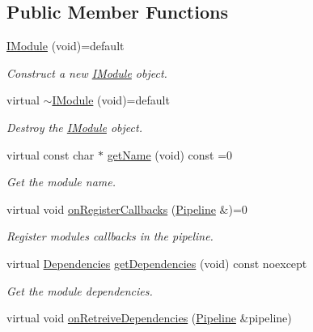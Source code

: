 \subsection*{Public Member Functions}
\begin{DoxyCompactItemize}
\item 
\mbox{\hyperlink{classo_z_1_1_i_module_a21fdd98fb701ae6f7f0e0de14beb72de}{I\+Module}} (void)=default
\begin{DoxyCompactList}\small\item\em Construct a new \mbox{\hyperlink{classo_z_1_1_i_module}{I\+Module}} object. \end{DoxyCompactList}\item 
virtual \mbox{\hyperlink{classo_z_1_1_i_module_a6ac6f3edf9fe885b2510dc01379a951c}{$\sim$\+I\+Module}} (void)=default
\begin{DoxyCompactList}\small\item\em Destroy the \mbox{\hyperlink{classo_z_1_1_i_module}{I\+Module}} object. \end{DoxyCompactList}\item 
virtual const char $\ast$ \mbox{\hyperlink{classo_z_1_1_i_module_af41d45158fd28e1bd86a34e25f5282d6}{get\+Name}} (void) const =0
\begin{DoxyCompactList}\small\item\em Get the module name. \end{DoxyCompactList}\item 
virtual void \mbox{\hyperlink{classo_z_1_1_i_module_a3dc905faa6df5e22eecc6ffbc923fd95}{on\+Register\+Callbacks}} (\mbox{\hyperlink{classo_z_1_1_pipeline}{Pipeline}} \&)=0
\begin{DoxyCompactList}\small\item\em Register module\textquotesingle{}s callbacks in the pipeline. \end{DoxyCompactList}\item 
virtual \mbox{\hyperlink{classo_z_1_1_i_module_ac13210556cb2a65d186bfbe5208c666c}{Dependencies}} \mbox{\hyperlink{classo_z_1_1_i_module_a720a329e6ebcbecbc150d8b0bbee6e37}{get\+Dependencies}} (void) const noexcept
\begin{DoxyCompactList}\small\item\em Get the module dependencies. \end{DoxyCompactList}\item 
virtual void \mbox{\hyperlink{classo_z_1_1_i_module_af183d3711ef7d7a6966ac078b63a7685}{on\+Retreive\+Dependencies}} (\mbox{\hyperlink{classo_z_1_1_pipeline}{Pipeline}} \&pipeline)

\end{DoxyCompactItemize}
